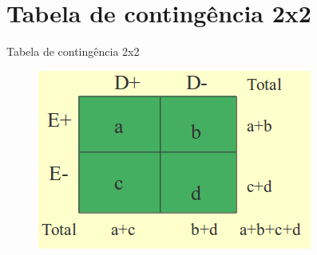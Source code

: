 \documentclass[9pt]{beamer}
\begin{document}
\section{Tabela de contingência 2x2}
\begin{frame}{Tabela de contingência 2x2}{}


\begin{figure}[!htb]
    \centering
    \includegraphics[scale=0.65]{tab.png}
\end{figure}


\end{frame}
\end{document}
